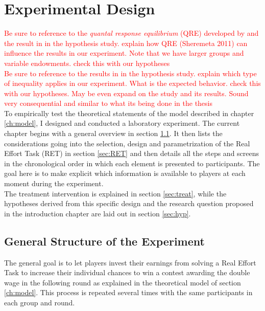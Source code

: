     \chapter{Experimental Design}
    \label{ch:experiment}
    \thispagestyle{fancy}
    
    
\textcolor{red}{Be sure to reference to the \textit{quantal response equilibrium} (QRE) developed by \cite{mckelvey1995} and the result in \cite{sheremeta2011} in the hypothesis study. explain how QRE (Sheremeta 2011) can influence the results in our experiment. Note that we have larger groups and variable endowments. check this with our hypotheses}\\


\textcolor{red}{Be sure to reference to the results in \cite{fallucchi2017} in the hypothesis study. explain which type of inequality applies in our experiment. What is the expected behavior. check this with our hypotheses. May be even expand on the study and its results. Sound very consequential and similar to what its being done in the thesis}\\
    
    To empirically test the theoretical statements of the model described in chapter \ref{ch:model}, I designed and conducted a laboratory experiment. The current chapter begins with a general overview in section \ref{sec:gen_str}. It then lists the considerations going into the selection, design and parametrization of the Real Effort Task (RET) in section \ref{sec:RET} and then details all the steps and screens in the chronological order in which each element is presented to participants. The goal here is to make explicit which information is available to players at each moment during the experiment.\\
    
    The treatment intervention is explained in section \ref{sec:treat}, while the hypotheses derived from this specific design and the research question proposed in the introduction chapter are laid out in section \ref{sec:hyp}.
    
    \section{General Structure of the Experiment}
    \label{sec:gen_str}
    
    The general goal is to let players invest their earnings from solving a Real Effort Task to increase their individual chances to win a contest awarding the double wage in the following round as explained in the theoretical model of section \ref{ch:model}. This process is repeated several times with the same participants in each group and round.\\ 
    
